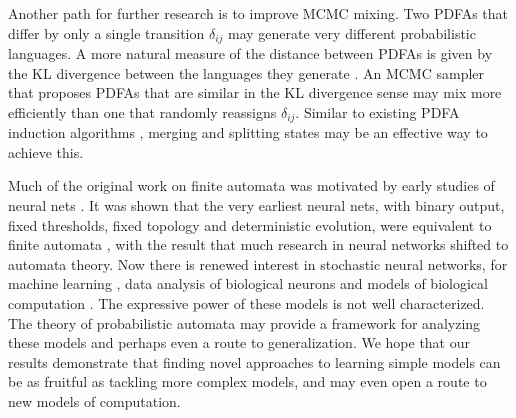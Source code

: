 Another path for further research is to improve MCMC mixing.  Two PDFAs that differ by only a single transition $\delta_{ij}$ may generate very different probabilistic languages.  A more natural measure of the distance between PDFAs is given by the KL divergence between the languages they generate \cite{Carrasco1994}.  An MCMC sampler that proposes PDFAs that are similar in the KL divergence sense may mix more efficiently than one that randomly reassigns $\delta_{ij}$.  Similar to existing PDFA induction algorithms \cite{Shalizi2004,Thollard2000}, merging and splitting states may be an effective way to achieve this.

Much of the original work on finite automata was motivated by early studies of neural nets \cite{Hopcroft1979}.  It was shown that the very earliest neural nets, with binary output, fixed thresholds, fixed topology and deterministic evolution, were equivalent to finite automata \cite{Kleene1956}, with the result that much research in neural networks shifted to automata theory.  Now there is renewed interest in stochastic neural networks, for machine learning \cite{Hinton2006}, data analysis of biological neurons \cite{Paninski} and models of biological computation \cite{Pouget? Lengyel? Fiser?}.  The expressive power of these models is not well characterized.  The theory of probabilistic automata may provide a framework for analyzing these models and perhaps even a route to generalization.  We hope that our results demonstrate that finding novel approaches to learning simple models can be as fruitful as tackling more complex models, and may even open a route to new models of computation.